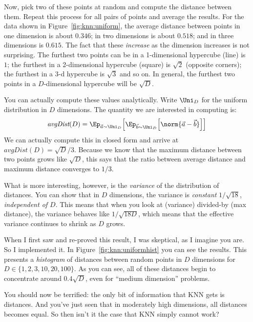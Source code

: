 Now, pick two of these points at random and compute the distance
between them.  Repeat this process for all pairs of points and average
the results.  For the data shown in Figure~\ref{fig:knn:uniform}, the
average distance between points in one dimension is about $0.346$; in two
dimensions is about $0.518$; and in three dimensions is $0.615$. The fact that these \emph{increase} as the dimension increases is not surprising. The furthest two points can be in a 1-dimensional hypercube (line) is $1$; the furthest in a 2-dimensional hypercube (square) is $\sqrt 2$ (opposite corners); the furthest in a 3-d hypercube is $\sqrt 3$ and so on. In general, the furthest two points in a $D$-dimensional hypercube will be $\sqrt D$.

You can actually compute these values analytically.  Write $\Uni_D$ for
the uniform distribution in $D$ dimensions.  The quantity we are
interested in computing is:
\begin{equation} \label{eq:knn:dist}
  \textit{avgDist}(D)
  = \Ep_{\vec a \sim \Uni_D} \Big[
    \Ep_{\vec b \sim \Uni_D} \Big[
      \norm{\vec a - \vec b}
      \Big] \Big]
\end{equation}
We can actually compute this in closed form and arrive
at $\textit{avgDist}(D) = \sqrt D / 3$. Because we know that the maximum distance between two points grows like $\sqrt D$, this says that the ratio between average distance and maximum distance converges to $1/3$. 

What is more interesting, however, is the \emph{variance} of the distribution of distances. You can show that in $D$ dimensions, the variance is \emph{constant} $1/\sqrt{18}$, \emph{independent of $D$}. This means that when you look at (variance) divided-by (max distance), the variance behaves like $1/\sqrt{18 D}$, which means that the effective variance continues to shrink as $D$ grows.


When I first saw and re-proved this result, I was skeptical, as I
imagine you are.  So I implemented it.  In
Figure~\ref{fig:knn:uniformhist} you can see the results.  This
presents a \emph{histogram} of distances between random points in $D$
dimensions for $D \in \{1,2,3,10,20,100\}$.  As you can see, all of
these distances begin to concentrate around $0.4\sqrt{D}$, even for ``medium
dimension'' problems.

You should now be terrified: the only bit of information that KNN gets
is distances.  And you've just seen that in moderately high dimensions,
all distances becomes equal.  So then isn't it the case that KNN
simply cannot work?

